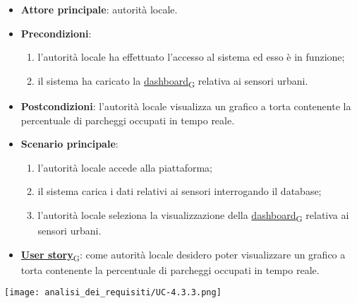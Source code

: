 \newpage
{}
\begin{itemize}
	\item \textbf{Attore principale}: autorità locale.
	\item \textbf{Precondizioni}:
	      \begin{enumerate}
		      \item l'autorità locale ha effettuato l'accesso al sistema ed esso è in funzione;
		      \item il sistema ha caricato la \href{https://7last.github.io/docs/pb/documentazione-interna/glossario\#dashboard}{dashboard\textsubscript{G}} relativa ai sensori urbani.
	      \end{enumerate}
	\item \textbf{Postcondizioni}: l'autorità locale visualizza un grafico a torta contenente la percentuale di parcheggi occupati in tempo reale.
	\item \textbf{Scenario principale}:
	      \begin{enumerate}
		      \item l'autorità locale accede alla piattaforma;
		      \item il sistema carica i dati relativi ai sensori interrogando il database;
		      \item l'autorità locale seleziona la visualizzazione della \href{https://7last.github.io/docs/pb/documentazione-interna/glossario\#dashboard}{dashboard\textsubscript{G}} relativa ai sensori urbani.
	      \end{enumerate}
	\item \href{https://7last.github.io/docs/pb/documentazione-interna/glossario\#user-story}{\textbf{User story}\textsubscript{G}}:
	      come autorità locale desidero poter visualizzare un grafico a torta contenente la percentuale di parcheggi occupati in tempo reale.
\end{itemize}
\begin{center}
	\texttt{[image: analisi\_dei\_requisiti/UC-4.3.3.png]}
\end{center}

